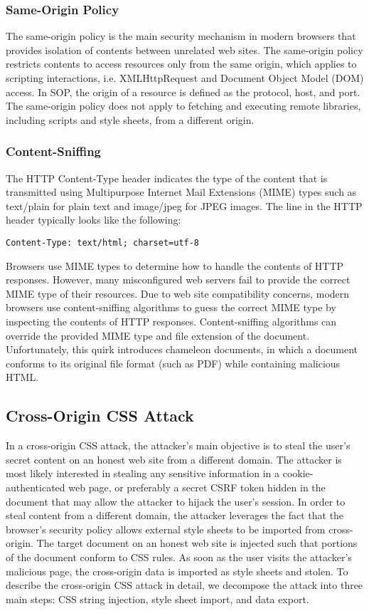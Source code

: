 \documentclass{acm_proc_article-sp}
\begin{document}
\subsubsection{Same-Origin Policy}
The same-origin policy\cite{mozillasameorigin} is the main security mechanism in modern browsers that provides isolation of contents between unrelated web sites. The same-origin policy restricts contents to access resources only from the same origin, which applies to scripting interactions, i.e. XMLHttpRequest and Document Object Model (DOM)\cite{dom} access. In SOP, the origin of a resource is defined as the protocol, host, and port. The same-origin policy does not apply to fetching and executing remote libraries, including scripts and style sheets, from a different origin.

\subsubsection{Content-Sniffing}
The HTTP Content-Type header indicates the type of the content that is transmitted using Multipurpose Internet Mail Extensions (MIME)\cite{mime} types such as text/plain for plain text and image/jpeg for JPEG images. The line in the HTTP header typically looks like the following:
\begin{verbatim}
Content-Type: text/html; charset=utf-8
\end{verbatim}
Browsers use MIME types to determine how to handle the contents of HTTP responses. However, many misconfigured web servers fail to provide the correct MIME type of their resources. Due to web site compatibility concerns, modern browsers use content-sniffing algorithms\cite{securecontentsniffing} to guess the correct MIME type by inspecting the contents of HTTP responses.  Content-sniffing algorithms can override the provided MIME type and file extension of the document. Unfortunately, this quirk introduces chameleon documents, in which a document conforms to its original file format (such as PDF) while containing malicious HTML.

\subsection{Cross-Origin CSS Attack}
In a cross-origin CSS attack, the attacker's main objective is to steal the user's secret content on an honest web site from a different domain. The attacker is most likely interested in stealing any sensitive information in a cookie-authenticated web page, or preferably a secret CSRF token\cite{csrf} hidden in the document that may allow the attacker to hijack the user's session. In order to steal content from a different domain, the attacker leverages the fact that the browser's security policy allows external style sheets to be imported from cross-origin. The target document on an honest web site is injected such that portions of the document conform to CSS rules. As soon as the user visits the attacker's malicious page, the cross-origin data is imported as style sheets and stolen. To describe the cross-origin CSS attack in detail, we decompose the attack into three main steps: CSS string injection, style sheet import, and data export.
\end{document}
